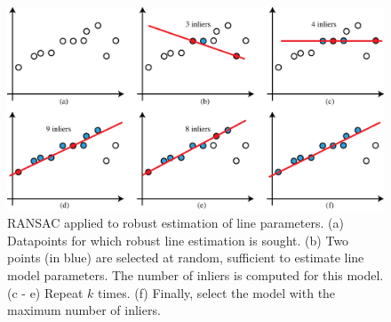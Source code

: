 \begin{figure}[t]
    \centerline{
        \includegraphics[width=1\linewidth]{figures/homography/ransac_algo.eps}
    }
    \caption{RANSAC applied to robust estimation of line parameters. (a) Datapoints for which robust line estimation is sought. (b) Two points (in blue) are selected at random, sufficient to estimate line model parameters. The number of inliers is computed for this model. (c - e) Repeat $k$ times. (f) Finally, select the model with the maximum number of inliers.}
    \label{fig:ransac}
\end{figure}

